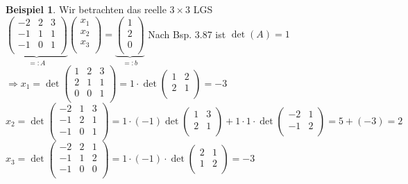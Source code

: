 \documentclass[10pt,a4paper,numbers=endperiod]{scrartcl}
\theoremstyle{definition}
\newtheorem{bsp}[satz]{Beispiel}
\begin{document}
\begin{bsp}
	Wir betrachten das reelle $3 \times 3$ LGS\\
	
	$\underbrace{\begin{pmatrix}
	-2 & 2 & 3\\
	-1 & 1 & 1\\
	-1 & 0 & 1\\
	\end{pmatrix}}_{=:A} \begin{pmatrix}
	x_1\\
	x_2\\
	x_3\\
	\end{pmatrix} = \underbrace{\begin{pmatrix}
	1\\	
	2\\
	0\\
	\end{pmatrix}}_{=: b}$ 
	Nach Bsp. 3.87 ist $\det(A) = 1$\\
	$\Rightarrow x_1 = \det \begin{pmatrix}
	1 & 2 & 3\\
	2 & 1 & 1\\
	0 & 0 & 1\\
	\end{pmatrix} = 1 \cdot \det \begin{pmatrix}
	1 & 2\\
	2 & 1\\
	\end{pmatrix} = -3$\\
	
	$x_2 = \det \begin{pmatrix}
	-2 & 1 & 3\\
	-1 & 2 & 1\\
	-1 & 0 & 1\\
	\end{pmatrix} = 1 \cdot (-1) \det \begin{pmatrix}
	1 & 3\\
	2 & 1\\
	\end{pmatrix} + 1 \cdot 1 \cdot \det \begin{pmatrix}
	-2 & 1\\
	-1 & 2\\
	\end{pmatrix} = 5 + (-3) = 2$\\
	
	$x_3 = \det \begin{pmatrix}
	-2 & 2 & 1\\
	-1 & 1 & 2\\
	-1 & 0 & 0\\
	\end{pmatrix} = 1  \cdot (-1) \cdot \det \begin{pmatrix}
	2 & 1\\
	1 & 2\\
	\end{pmatrix} = -3$\\
	

\end{bsp}
\end{document}
